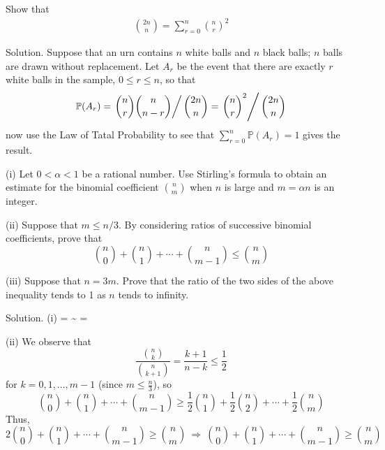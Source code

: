 \item Show that
\begin{eqnarray}
\binom{2n}{n} =\sum^n_{r=0}\binom{n}{r}^2
\end{eqnarray}	



Solution. Suppose that an urn contains $n$ white balls and $n$ black balls; $n$ balls are drawn without replacement. Let $A_r$ be the event that there are exactly $r$ white balls in the sample, $0\leq r\leq n$, so that
\begin{eqnarray}
\mathbb{P}(A_r)=\left.\binom{n}{r}\binom{n}{n-r}\right/\binom{2n}{n} = \left.\binom{n}{r}^2\right/\binom{2n}{n}
\end{eqnarray}	
now use the Law of Tatal Probability to see that $\sum^{n}_{r=0}\mathbb{P}(A_r)=1$ gives the result.


\item (i) Let $0<\alpha<1$ be a rational number. Use Stirling's formula to obtain an estimate for the binomial coefficient $\binom{n}{m}$ when $n$ is large and $m=\alpha n$ is an integer.

(ii) Suppose that $m\leq n/3$. By considering ratios of successive binomial coefficients, prove that 
\begin{equation}
\binom{n}{0}+\binom{n}{1}+\cdots+\binom{n}{m-1}\leq\binom{n}{m}
\end{equation}

(iii) Suppose that $n=3m$. Prove that the ratio of the two sides of the above inequality tends to 1 as $n$ tends to infinity.
 


Solution. (i) 
\beast
{} = \sim {} = 
\eeast

(ii) We observe that 
\begin{equation}
\frac{\binom{n}{k}}{\binom{n}{k+1}} =\frac{k+1}{n-k}\leq \frac{1}{2}
\end{equation}
for $k=0,1,\dots,m-1$ (since $m\leq \frac{n}{3}$), so
\begin{equation}
\binom{n}{0}+\binom{n}{1}+ \cdots + \binom{n}{m-1} \geq \frac{1}{2}\binom{n}{1} + \frac{1}{2}\binom{n}{2} + \cdots + \frac{1}{2}\binom{n}{m}
\end{equation}
Thus,
\begin{equation}
2\binom{n}{0}+\binom{n}{1}+ \cdots + \binom{n}{m-1} \geq \binom{n}{m} \ \Rightarrow \ \binom{n}{0}+\binom{n}{1}+ \cdots + \binom{n}{m-1} \geq \binom{n}{m} 
\end{equation}

